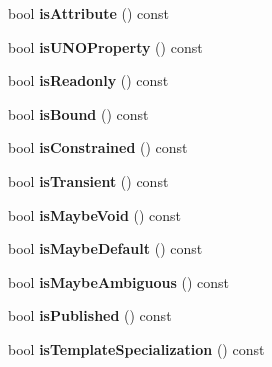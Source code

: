 \begin{DoxyCompactItemize}
\item 
\hypertarget{class_member_def_a4b9b1d587183ba11e1bfbed01a9f742f}{bool {\bfseries is\-Attribute} () const }\label{class_member_def_a4b9b1d587183ba11e1bfbed01a9f742f}

\item 
\hypertarget{class_member_def_a7963b5f788bd2d4cfe94f4981ebf8fea}{bool {\bfseries is\-U\-N\-O\-Property} () const }\label{class_member_def_a7963b5f788bd2d4cfe94f4981ebf8fea}

\item 
\hypertarget{class_member_def_aa1cf0d851c469110f2269696ebb99856}{bool {\bfseries is\-Readonly} () const }\label{class_member_def_aa1cf0d851c469110f2269696ebb99856}

\item 
\hypertarget{class_member_def_a3b29f170eb389b769be3eeb459c7c9ea}{bool {\bfseries is\-Bound} () const }\label{class_member_def_a3b29f170eb389b769be3eeb459c7c9ea}

\item 
\hypertarget{class_member_def_a4bcfe804203d694b0e7b10aa5b88cddc}{bool {\bfseries is\-Constrained} () const }\label{class_member_def_a4bcfe804203d694b0e7b10aa5b88cddc}

\item 
\hypertarget{class_member_def_aca8c42607b5a378a5cbc1cd8b0368d4d}{bool {\bfseries is\-Transient} () const }\label{class_member_def_aca8c42607b5a378a5cbc1cd8b0368d4d}

\item 
\hypertarget{class_member_def_a77f1d6d43f39deb7c3e23fd88dff48fe}{bool {\bfseries is\-Maybe\-Void} () const }\label{class_member_def_a77f1d6d43f39deb7c3e23fd88dff48fe}

\item 
\hypertarget{class_member_def_a0fb09db995987f24d06706e8eb1ace27}{bool {\bfseries is\-Maybe\-Default} () const }\label{class_member_def_a0fb09db995987f24d06706e8eb1ace27}

\item 
\hypertarget{class_member_def_aca4724e952f9893b02932a582f55f19e}{bool {\bfseries is\-Maybe\-Ambiguous} () const }\label{class_member_def_aca4724e952f9893b02932a582f55f19e}

\item 
\hypertarget{class_member_def_a3d09e3bb6fc4144c31a80fd26d401e69}{bool {\bfseries is\-Published} () const }\label{class_member_def_a3d09e3bb6fc4144c31a80fd26d401e69}

\item 
\hypertarget{class_member_def_a955950fa1fbd2f54e03c14261facc1b6}{bool {\bfseries is\-Template\-Specialization} () const }\label{class_member_def_a955950fa1fbd2f54e03c14261facc1b6}


\end{DoxyCompactItemize}
